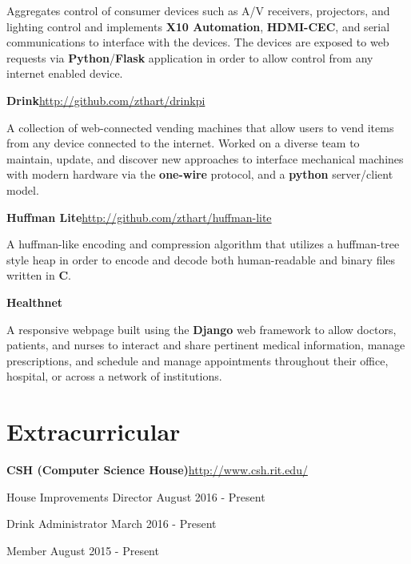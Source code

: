 \documentclass[margin,line]{resume}
\newcommand{\rurl}[1]{\hfill {\footnotesize \url{#1}}}
\begin{document}
\begin{resume}
\begin{asparablank}
		\small Aggregates control of consumer devices such as A/V receivers, projectors, and lighting control and implements \textbf{X10 Automation}, \textbf{HDMI-CEC}, and serial communications to interface with the devices. The devices are exposed to web requests via \textbf{Python}/\textbf{Flask} application in order to allow control from any internet enabled device.
		\normalsize
        \\
        \item {\bf Drink}\rurl{http://github.com/zthart/drinkpi}
        
        \small A collection of web-connected vending machines that allow users to vend items from any device connected to the internet. Worked on a diverse team to maintain, update, and discover new approaches to interface mechanical machines with modern hardware via the \textbf{one-wire} protocol, and a \textbf{python} server/client model.
        \normalsize
		\\
		\item {\bf Huffman Lite}\rurl{http://github.com/zthart/huffman-lite}
		
		\small A huffman-like encoding and compression algorithm that utilizes a huffman-tree style heap in order to encode and decode both human-readable and binary files written in \textbf{C}.
		\normalsize
		\\
        \item {\bf Healthnet}\rurl{}
        
        \small A responsive webpage built using the \textbf{Django} web framework to allow doctors, patients, and nurses to interact and share pertinent medical information, manage prescriptions, and schedule and manage appointments throughout their office, hospital, or across a network of institutions.
          
	\end{asparablank}    
    
\section{\mysidestyle Extracurricular}
	\begin{asparablank}
		\item {\bf CSH ({\small Computer Science House})}\rurl{http://www.csh.rit.edu/}
		\small	\item House Improvements Director \hfill August 2016 - Present
        \small  \item Drink Administrator \hfill March 2016 - Present
        \small  \item Member \hfill August 2015 - Present
        \linebreak
        

\end{asparablank}
\end{resume}
\end{document}
